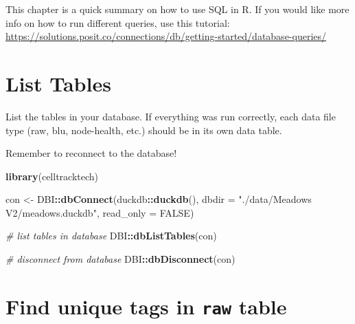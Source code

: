 \documentclass[
]{book}
\newenvironment{Shaded}{\begin{snugshade}}{\end{snugshade}}
\newcommand{\AttributeTok}[1]{\textcolor[rgb]{0.13,0.29,0.53}{#1}}
\newcommand{\CommentTok}[1]{\textcolor[rgb]{0.56,0.35,0.01}{\textit{#1}}}
\newcommand{\ConstantTok}[1]{\textcolor[rgb]{0.56,0.35,0.01}{#1}}
\newcommand{\FunctionTok}[1]{\textcolor[rgb]{0.13,0.29,0.53}{\textbf{#1}}}
\newcommand{\NormalTok}[1]{#1}
\newcommand{\OtherTok}[1]{\textcolor[rgb]{0.56,0.35,0.01}{#1}}
\newcommand{\SpecialCharTok}[1]{\textcolor[rgb]{0.81,0.36,0.00}{\textbf{#1}}}
\newcommand{\StringTok}[1]{\textcolor[rgb]{0.31,0.60,0.02}{#1}}
\begin{document}
This chapter is a quick summary on how to use SQL in R. If you would like more info on how to run different queries, use this tutorial: \url{https://solutions.posit.co/connections/db/getting-started/database-queries/}

\section{List Tables}\label{list-tables}

List the tables in your database. If everything was run correctly, each data file type (raw, blu, node-health, etc.) should be in its own data table.

Remember to reconnect to the database!

\begin{Shaded}
\begin{Highlighting}[]
\FunctionTok{library}\NormalTok{(celltracktech)}

\NormalTok{con }\OtherTok{\textless{}{-}}\NormalTok{ DBI}\SpecialCharTok{::}\FunctionTok{dbConnect}\NormalTok{(duckdb}\SpecialCharTok{::}\FunctionTok{duckdb}\NormalTok{(), }
                      \AttributeTok{dbdir =} \StringTok{"./data/Meadows V2/meadows.duckdb"}\NormalTok{, }
                      \AttributeTok{read\_only =} \ConstantTok{FALSE}\NormalTok{)}

\CommentTok{\# list tables in database}
\NormalTok{DBI}\SpecialCharTok{::}\FunctionTok{dbListTables}\NormalTok{(con)}

\CommentTok{\# disconnect from database}
\NormalTok{DBI}\SpecialCharTok{::}\FunctionTok{dbDisconnect}\NormalTok{(con)}
\end{Highlighting}
\end{Shaded}

\section{\texorpdfstring{Find unique tags in \texttt{raw} table}{Find unique tags in raw table}}\label{find-unique-tags-in-raw-table}
\end{document}
